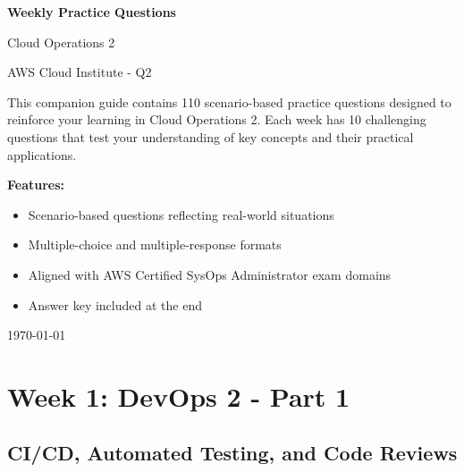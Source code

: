 \documentclass[12pt,a4paper]{article}
\begin{document}
\begin{titlepage}
    \centering
    \vspace*{2cm}
    
    {\Huge\bfseries Weekly Practice Questions\par}
    \vspace{1cm}
    {\LARGE Cloud Operations 2\par}
    \vspace{0.5cm}
    {\Large AWS Cloud Institute - Q2\par}
    \vspace{2cm}
    
    \begin{tcolorbox}[colback=blue!5!white,colframe=blue!75!black,title=About This Guide]
    This companion guide contains 110 scenario-based practice questions designed to reinforce your learning in Cloud Operations 2. Each week has 10 challenging questions that test your understanding of key concepts and their practical applications.
    
    \vspace{0.5cm}
    \textbf{Features:}
    \begin{itemize}
        \item Scenario-based questions reflecting real-world situations
        \item Multiple-choice and multiple-response formats
        \item Aligned with AWS Certified SysOps Administrator exam domains
        \item Answer key included at the end
    \end{itemize}
    \end{tcolorbox}
    
    \vspace{2cm}
    {\large \today\par}
\end{titlepage}

\tableofcontents
\newpage

\section{Week 1: DevOps 2 - Part 1}
\subsection{CI/CD, Automated Testing, and Code Reviews}
\end{document}
